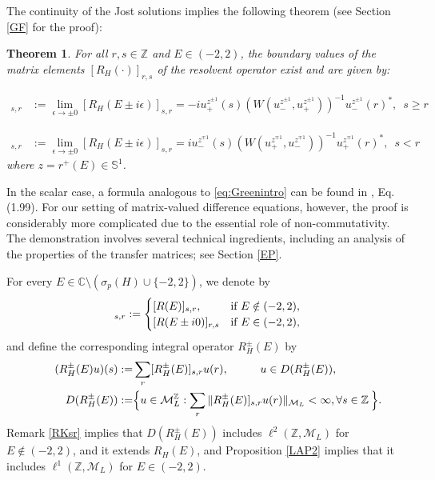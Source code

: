 \documentclass[12pt,oneside,onecolumn,open]{article}
\newtheorem{teo}{Theorem}[section]
\begin{document}
\color{black}
The continuity of the Jost solutions implies the following theorem (see Section \ref{GF} for the proof):
\begin{teo}\label{Greenlimitintro}
    For all $r,s \in \mathbb{Z}$ and $E \in (-2,2)$, the boundary values of the matrix elements $[R_{H}(\cdot)]_{r,s}$ of the resolvent operator exist and are given by:
    
    
    \begin{align}
        [R_{H}(E \pm i0)]_{s,r} &:= \lim_{\epsilon \to \pm 0} [R_{H}(E \pm i\epsilon)]_{s,r} = -iu_{+}^{z^{\pm 1}}(s)\left(W(u_{-}^{z^{\pm 1}}, u_{+}^{z^{\pm 1}})\right)^{-1} u_{-}^{z^{\pm 1}}(r)^{*}, \,\,\, s \geq r
    \end{align}
    
    
    \begin{align}
        [R_{H}(E \pm i0)]_{s,r} &:= \lim_{\epsilon \to \pm 0} [R_{H}(E \pm i\epsilon)]_{s,r} = iu_{-}^{z^{\mp 1}}(s)\left(W(u_+^{z^{\mp 1}}, u_-^{z^{\mp 1}})\right)^{-1} u_{+}^{z^{\mp 1}}(r)^{*},\,\,\, s<r
    \end{align}
    where $z = r^+(E) \in \mathbb{S}^{1}$.
\end{teo}
In the scalar case, a formula analogous to \eqref{eq:Greenintro} can be found in \cite{MR1711536}, Eq. (1.99). For our setting of matrix-valued difference equations, however, the proof is considerably more complicated due to the essential role of non-commutativity. The demonstration involves several technical ingredients, including an analysis of the properties of the transfer matrices; see Section \ref{EP}.

For every  $ E \in \mathbb{C} \setminus (\sigma_p(H)  \cup \{-2,2 \})   $, we denote by 
\begin{align}
   [ R^{\pm }_H(E) ]_{s,r}: = \begin{cases}
       [ R(E) ]_{s,r},  & \text{if   $ E \notin (-2,2) $}, \\ 
       [ R(E \pm i0)]_{r,s}  & \text{if   $ E \in (-2,2) $},    \end{cases}
\end{align}
and define the corresponding integral operator  $ R^{\pm }_H(E)$ by
\begin{align}
 (R^{\pm }_H(E) u)(s) : = &   \sum_{r}  [ R^{\pm }_H(E) ]_{s,r} u(r),   \hspace{1cm}   
  u \in D(R^{\pm }_H(E)) , \\ \notag   
\hspace{1cm}   D(R^{\pm }_H(E)) :  = & \Big \{  u \in \mathcal{M}_{L}^{\mathbb{Z}}  :   \sum_{r}  \| R^{\pm }_H(E) ]_{s,r} u(r) \|_{\mathcal{M}_L} < \infty  , \forall s \in  \mathbb{Z}  \:   \Big \}. 
\end{align}
Remark \ref{RKsr} implies that $ D(R^{\pm }_H(E)) $ includes $  \ell^2(\mathbb{Z}, \mathcal{M}_L) $ for $  E \notin (-2, 2) $, and it extends $R_H(E)$,  and Proposition \ref{LAP2}
 implies that it includes   $\ell^1(\mathbb{Z}, \mathcal{M}_L) $  for $  E \in (-2, 2) .$ 
\end{document}
